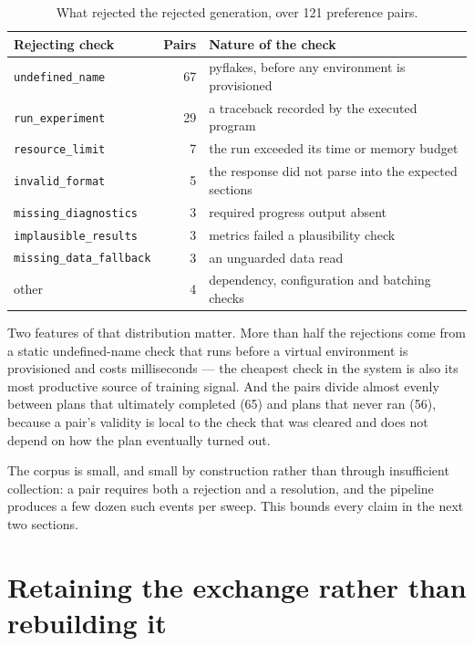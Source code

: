 \begin{table}[htbp]
\centering\small
\caption{What rejected the rejected generation, over 121 preference pairs.}
\label{tab:pair-sources}
\begin{tabularx}{\textwidth}{lrX}
\toprule
\textbf{Rejecting check} & \textbf{Pairs} & \textbf{Nature of the check} \\
\midrule
\texttt{undefined\_name}        & 67 & pyflakes, before any environment is provisioned \\
\texttt{run\_experiment}        & 29 & a traceback recorded by the executed program \\
\texttt{resource\_limit}        &  7 & the run exceeded its time or memory budget \\
\texttt{invalid\_format}        &  5 & the response did not parse into the expected sections \\
\texttt{missing\_diagnostics}   &  3 & required progress output absent \\
\texttt{implausible\_results}   &  3 & metrics failed a plausibility check \\
\texttt{missing\_data\_fallback} &  3 & an unguarded data read \\
other                           &  4 & dependency, configuration and batching checks \\
\bottomrule
\end{tabularx}
\end{table}

Two features of that distribution matter. More than half the rejections come
from a static undefined-name check that runs before a virtual environment is
provisioned and costs milliseconds --- the cheapest check in the system is also
its most productive source of training signal. And the pairs divide almost
evenly between plans that ultimately completed (65) and plans that never ran
(56), because a pair's validity is local to the check that was cleared and does
not depend on how the plan eventually turned out.

The corpus is small, and small by construction rather than through insufficient
collection: a pair requires both a rejection and a resolution, and the pipeline
produces a few dozen such events per sweep. This bounds every claim in the next
two sections.

\section{Retaining the exchange rather than rebuilding it}
\label{sec:po-transcripts}

